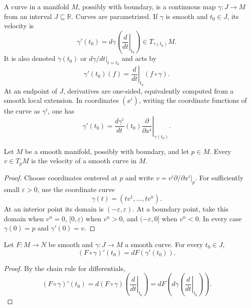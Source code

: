 \begin{definition}
\label{def:3-17-extra-1}




A curve in a manifold $M$, possibly with boundary, is a continuous map
$\gamma:J\to M$ from an interval $J\subseteq\mathbb{R}$. Curves are
parametrized. If $\gamma$ is smooth and $t_0\in J$, its velocity is
\[
\gamma'(t_0)
=d\gamma\left(\left.\frac{d}{dt}\right|_{t_0}\right)
\in T_{\gamma(t_0)}M.
\]
It is also denoted $\dot\gamma(t_0)$ or $d\gamma/dt|_{t=t_0}$ and acts by
\[
\gamma'(t_0)(f)=\left.\frac{d}{dt}\right|_{t_0}(f\circ\gamma).
\]
At an endpoint of $J$, derivatives are one-sided, equivalently computed from
a smooth local extension. In coordinates $(x^i)$, writing the coordinate
functions of the curve as $\gamma^i$, one has
\[
\gamma'(t_0)
=\left.\frac{d\gamma^i}{dt}(t_0)
  \frac{\partial}{\partial x^i}\right|_{\gamma(t_0)}.
\]
\end{definition}

\begin{proposition}
\label{prop:3-23}




Let $M$ be a smooth manifold, possibly with boundary, and let $p\in M$. Every
$v\in T_pM$ is the velocity of a smooth curve in $M$.
\end{proposition}

\begin{proof}

\sketch
Choose coordinates centered at $p$ and write
$v=v^i\partial/\partial x^i|_p$. For sufficiently small $\varepsilon>0$, use
the coordinate curve
\[
\gamma(t)=(tv^1,\ldots,tv^n). \tag{3.14}
\]
At an interior point its domain is $(-\varepsilon,\varepsilon)$. At a boundary
point, take this domain when $v^n=0$, $[0,\varepsilon)$ when $v^n>0$, and
$(-\varepsilon,0]$ when $v^n<0$. In every case $\gamma(0)=p$ and
$\gamma'(0)=v$.
\end{proof}

\begin{proposition}
\label{prop:3-24}




Let $F:M\to N$ be smooth and $\gamma:J\to M$ a smooth curve. For every
$t_0\in J$,
\[
(F\circ\gamma)'(t_0)=dF(\gamma'(t_0)).
\]
\end{proposition}

\begin{proof}

\sketch
By the chain rule for differentials,
\[
(F\circ\gamma)'(t_0)
=d(F\circ\gamma)\left(\left.\frac{d}{dt}\right|_{t_0}\right)
=dF\left(d\gamma\left(\left.\frac{d}{dt}\right|_{t_0}\right)\right).
\]
\end{proof}

